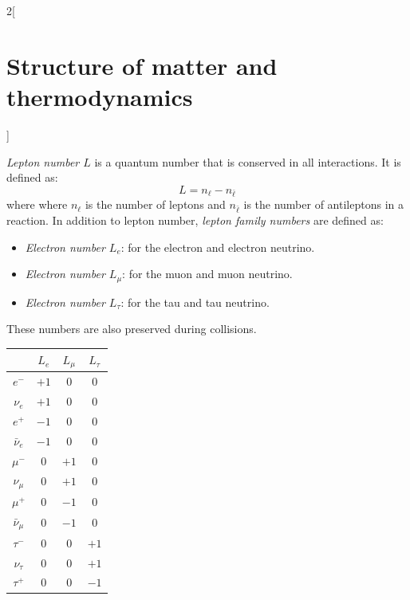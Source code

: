 \documentclass[../../../main.tex]{subfiles}
\begin{document}
\begin{multicols}{2}[\section{Structure of matter and thermodynamics}]
\begin{definition}[Lepton]
    \end{definition}
    \begin{definition}
        \textit{Lepton number $L$} is a quantum number that is conserved in all interactions. It is defined as: $$L=n_\ell-n_{\bar{\ell}}$$ where where  $n_\ell$ is the number of leptons and $n_{\bar{\ell}}$ is the number of antileptons in a reaction. In addition to lepton number, \textit{lepton family numbers} are defined as:
        \begin{itemize}
            \item \textit{Electron number $L_e$}: for the electron and electron neutrino.
            \item \textit{Electron number $L_\mu$}: for the muon and muon neutrino.
            \item \textit{Electron number $L_\tau$}: for the tau and tau neutrino.
        \end{itemize}
        These numbers are also preserved during collisions.
        \begin{center}
            \begin{minipage}{\linewidth}
                \centering
                \begin{tabular}{cccc}
                                     & $L_e$ & $L_\mu$ & $L_\tau$ \\
                    \hline
                    $e^-$            & $+1$  & 0       & 0        \\
                    $\nu_e$          & $+1$  & 0       & 0        \\
                    $e^+$            & $-1$  & 0       & 0        \\
                    $\bar{\nu}_e$    & $-1$  & 0       & 0        \\
                    $\mu^-$          & 0     & $+1$    & 0        \\
                    $\nu_\mu$        & 0     & $+1$    & 0        \\
                    $\mu^+$          & 0     & $-1$    & 0        \\
                    $\bar{\nu}_\mu$  & 0     & $-1$    & 0        \\
                    $\tau^-$         & 0     & 0       & $+1$     \\
                    $\nu_\tau$       & 0     & 0       & $+1$     \\
                    $\tau^+$         & 0     & 0       & $-1$     \\

\end{tabular}
\end{minipage}
\end{center}
\end{definition}
\end{multicols}
\end{document}
